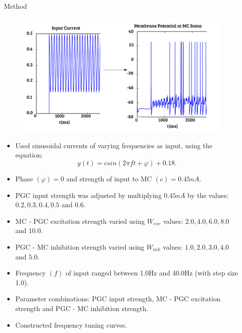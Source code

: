 \documentclass[final,hyperref={pdfpagelabels=false}]{beamer}
\begin{document}
\begin{frame}{}
\begin{columns}[t]
\begin{column}{.48\linewidth}
\begin{block}{Method} 
\begin{figure}
\center
\includegraphics[scale=0.9]{images/Figure2}
\end{figure}
\begin{itemize}
\item Used sinusoidal currents of varying frequencies as input, using the equation:
\begin{equation}
y(t) = csin(2 \pi ft + \varphi) + 0.18. 
\end{equation}
\item Phase $(\varphi) = 0$ and strength of input to MC $(c) = 0.45nA$.
\item PGC input strength was adjusted by multiplying $0.45nA$ by the values: $0.2, 0.3, 0.4, 0.5$ and $0.6$.
\item MC - PGC excitation strength varied using $W_{exc}$ values: $2.0, 4.0, 6.0, 8.0$ and $10.0$.
\item PGC - MC inhibition strength varied using $W_{inh}$ values: $1.0, 2.0, 3.0, 4.0$ and $5.0$.
\item Frequency $(f)$ of input ranged between 1.0Hz and 40.0Hz (with step size 1.0).
\item Parameter combinations: PGC input strength, MC - PGC excitation strength and PGC - MC inhibition strength.
\item Constructed frequency tuning curves.
\end{itemize}
\end{block}

\end{column}
\begin{column}{.48\linewidth}


\end{column}
\end{columns}
\end{frame}
\end{document}
